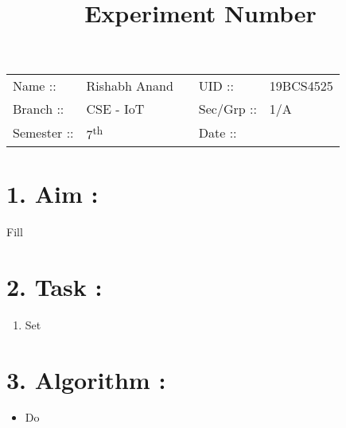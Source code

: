 \documentclass[14pt]{extarticle}
\title{%
    \textbf{
    \vspace{-3em} \\
    \Large Experiment Number\
    \vspace{-4em}
    }
}
\author{}
\date{}
\begin{document}
\maketitle %

\section*{}
    \begin{tabular}{ llp{2cm}ll }
        Name :: & Rishabh Anand & & UID :: & 19BCS4525  \\
        Branch :: & CSE - IoT & & Sec/Grp :: & 1/A \\
        Semester :: & 7\textsuperscript{th} & & Date :: & \shortdate{\today} \\
    \end{tabular}

\vspace{1em}

\section*{\normalsize 1. Aim :}

Fill

\section*{\normalsize 2. Task :}

\begin{enumerate}
  \item Set
\end{enumerate}


\section*{\normalsize 3. Algorithm :}

\begin{itemize}
  \item Do
\end{itemize}
\end{document}

